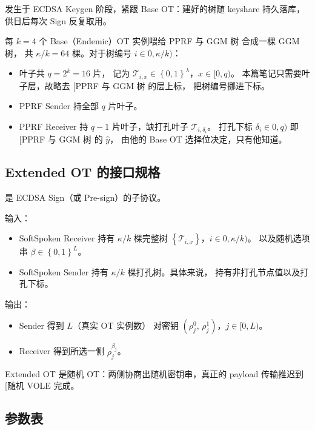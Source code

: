 发生于 ECDSA Keygen 阶段，紧跟 Base OT：建好的树随 keyshare 持久落库，
供日后每次 Sign 反复取用。

每 $k = 4$ 个 Base（Endemic）OT 实例喂给 PPRF 与 GGM 树 合成一棵 GGM 树，
共 $\kappa/k = 64$ 棵。对于树编号 $i \in 0, \kappa/k)$：

\begin{itemize}

\item
  叶子共 $q = 2^k = 16$ 片，
  记为 $\mathcal{T}_{i,x} \in \left\{0,1\right\}^\lambda$，$x \in [0, q)$。
  本篇笔记只需要叶子层，故略去 {[}PPRF 与 GGM 树 的层上标，
  把树编号挪进下标。
\item
  PPRF Sender 持全部 $q$ 片叶子。
\item
  PPRF Receiver 持 $q-1$ 片叶子，缺打孔叶子 $\mathcal{T}_{i,\delta_i}$。
  打孔下标 $\delta_i \in 0, q)$ 即 {[}PPRF 与 GGM 树 的 $\hat y$，
  由他的 Base OT 选择位决定，只有他知道。
\end{itemize}

\subsection{Extended OT 的接口规格}\label{sec:softspoken:spec}

是 ECDSA Sign（或 Pre-sign）的子协议。  

输入：

\begin{itemize}

\item
  SoftSpoken Receiver
  持有 $\kappa/k$ 棵完整树 $\left\{\mathcal{T}_{i,x}\right\}$，$i\in 0, \kappa/k)$。
  以及随机选项串 $\beta \in \left\{0,1\right\}^L$。
\item
  SoftSpoken Sender 持有 $\kappa/k$ 棵打孔树。具体来说，
  持有非打孔节点值以及打孔下标。
\end{itemize}

输出：

\begin{itemize}

\item
  Sender 得到 $L$（真实 OT 实例数）
  对密钥 $\left(\rho^0_j,\, \rho^1_j\right)$，$j \in [0, L)$。
\item
  Receiver 得到所选一侧 $\rho^{\beta_j}_j$。
\end{itemize}

Extended OT 是随机 OT：两侧协商出随机密钥串，真正的 payload 传输推迟到
{[}随机 VOLE 完成。

\subsection{参数表}

